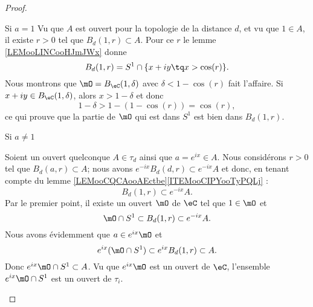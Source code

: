 \begin{proof}
\begin{subproof}
        \begin{subproof}
            \item[Si \( a=1\)]
                Vu que \( A\) est ouvert pour la topologie de la distance \( d\), et vu que \( 1\in A\), il existe \( r>0\) tel que \( B_d(1,r)\subset A\). Pour ce \( r\) le lemme \ref{LEMooLINCooHJmJWx} donne
                \begin{equation}
                    B_d(1,r)=S^1\cap\{ x+iy\tq x>\cos(r) \}.
                \end{equation}
                Nous montrons que \( \mO=B_{\eC}(1,\delta)\) avec \( \delta<1-\cos(r)\) fait l'affaire. Si \( x+iy\in B_{\eC}(1,\delta)\), alors \( x>1-\delta\) et donc
                \begin{equation}
                    1-\delta>1-(1-\cos(r))=\cos(r),
                \end{equation}
                ce qui prouve que la partie de \( \mO\) qui est dans \( S^1\) est bien dans \( B_d(1,r)\).
            \item[Si \( a\neq 1\)]

                Soient un ouvert quelconque \( A\in\tau_d\) ainsi que \( a= e^{ix}\in A\). Nous considérons \( r>0\) tel que \( B_d(a,r)\subset A\); nous avons \(  e^{-ix}B_d(d,r)\subset  e^{-ix}A\) et donc, en tenant compte du lemme \ref{LEMooCQCAooAEctbe}\ref{ITEMooCIPYooTyPQLj} :
                \begin{equation}
                    B_d(1,r)\subset  e^{-ix}A.
                \end{equation}
                Par le premier point, il existe un ouvert \( \mO\) de \( \eC\) tel que \( 1\in \mO\) et
                \begin{equation}
                    \mO\cap S^1\subset B_d(1,r)\subset  e^{-ix}A.
                \end{equation}
                Nous avons évidemment que \( a\in e^{ix}\mO\) et
                \begin{equation}
                    e^{ix}(\mO\cap S^1)\subset  e^{ix}B_d(1,r)\subset A.
                \end{equation}
                Donc \(  e^{ix}\mO\cap S^1\subset A\). Vu que \(  e^{ix}\mO\) est un ouvert de \( \eC\), l'ensemble \(  e^{ix}\mO\cap S^1\) est un ouvert de \( \tau_i\).
        \end{subproof}
\end{subproof}
\end{proof}

